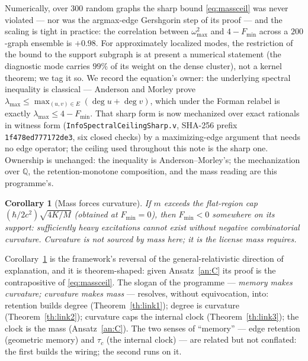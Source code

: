 \documentclass[10pt,twocolumn]{article}
\newtheorem{corollary}{Corollary}
\theoremstyle{definition}
\newcommand{\code}[1]{\texttt{#1}}
\begin{document}
Numerically, over $300$ random graphs the sharp bound \eqref{eq:massceil} was
never violated --- nor was the argmax-edge Gershgorin step of its proof --- and the
scaling is tight in practice: the correlation between $\omega_{\max}^2$ and
$4-F_{\min}$ across a $200$-graph ensemble is $+0.98$.
For approximately localized modes, the restriction of the bound to the support
subgraph is at present a numerical statement (the diagnostic mode carries $99\%$ of
its weight on the dense cluster), not a kernel theorem; we tag it so.
We record the equation's owner: the underlying spectral inequality is classical ---
Anderson and Morley \cite{andersonmorley} prove
$\lambda_{\max} \le \max_{(u,v)\in E}(\deg u+\deg v)$, which under the Forman
relabel is exactly $\lambda_{\max} \le 4 - F_{\min}$. That sharp form is now
mechanized over exact rationals in witness form
(\code{InfoSpectralCeilingSharp.v}, SHA-256 prefix \code{1f478ed777172de3},
six closed checks) by a maximizing-edge argument that needs no edge operator;
the ceiling used throughout this note is the sharp one. Ownership is unchanged: the inequality is
Anderson--Morley's; the mechanization over $\mathbb{Q}$, the retention-monotone
composition, and the mass reading are this programme's.

\begin{corollary}[Mass forces curvature]\label{cor:forces}
If $m$ exceeds the flat-region cap
$(\hbar/2c^2)\sqrt{4K/M}$ (obtained at $F_{\min}=0$), then $F_{\min}<0$ somewhere on
its support: sufficiently heavy excitations \emph{cannot exist} without negative
combinatorial curvature. Curvature is not sourced by mass here; it is the license
mass requires.
\end{corollary}

Corollary~\ref{cor:forces} is the framework's reversal of the general-relativistic
direction of explanation, and it is theorem-shaped: given Ansatz~\ref{an:C} its proof
is the contrapositive of \eqref{eq:massceil}. The slogan of the programme ---
\emph{memory makes curvature; curvature makes mass} --- resolves, without
equivocation, into: retention builds degree (Theorem~\ref{th:link1}); degree is
curvature (Theorem~\ref{th:link2}); curvature caps the internal clock
(Theorem~\ref{th:link3}); the clock is the mass (Ansatz~\ref{an:C}). The two senses of
``memory'' --- edge retention (geometric memory) and $\tau_c$ (the internal clock) ---
are related but not conflated: the first builds the wiring; the second runs on it.
\end{document}
